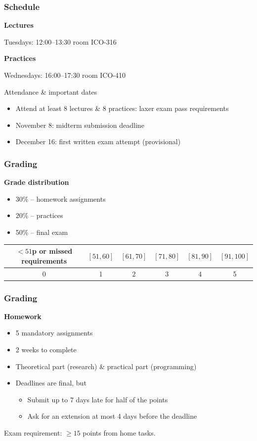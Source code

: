 \begin{frame}
  \frametitle{Schedule}

  \textbf{Lectures}

  Tuesdays: 12:00--13:30 room ICO-316

  \vspace*{1em}

  \pause
  \textbf{Practices}

  Wednesdays: 16:00--17:30 room ICO-410

  \vspace*{1em}

  \pause
  Attendance \& important dates
  \begin{itemize}[<+(1)->]
    \item Attend at least 8 lectures \& 8 practices: laxer exam pass requirements
    \item November 8: midterm submission deadline
    \item December 16: first written exam attempt (provisional)
  \end{itemize}
\end{frame}

\begin{frame}
  \frametitle{Grading}

  \pause
  \textbf{Grade distribution}
  \begin{itemize}
    \item 30\% -- homework assignments
    \item 20\% -- practices
    \item 50\% -- final exam
  \end{itemize}

  \vspace*{1em}

  \pause
  \begin{tabular}{cccccc}
    $< 51$p or missed requirements & $[51, 60]$ & $[61, 70]$ & $[71, 80]$ & $[81, 90]$ & $[91, 100]$\\
    \midrule
    0 & 1 & 2 & 3 & 4 & 5
  \end{tabular}
\end{frame}

\begin{frame}
  \frametitle{Grading}

  \textbf{Homework}
  \begin{itemize}[<+(1)->]
    \item 5 mandatory assignments
    \item 2 weeks to complete
    \item Theoretical part (research) \& practical part (programming)
    \item Deadlines are final, but
    \begin{itemize}
      \item Submit up to 7 days late for half of the points
      \item Ask for an extension at most 4 days before the deadline
    \end{itemize}
  \end{itemize}

  \pause
  Exam requirement: $\ge 15$ points from home tasks.
\end{frame}

